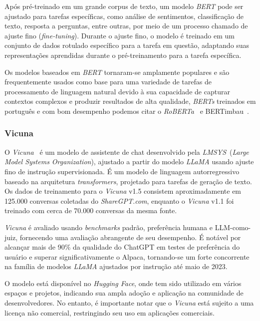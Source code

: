 Após pré-treinado em um grande corpus de texto, um modelo \textit{BERT} pode ser ajustado para tarefas específicas, como análise de sentimentos, classificação de texto, resposta a perguntas, entre outras, por meio de um processo chamado de ajuste fino (\textit{fine-tuning}). Durante o ajuste fino, o modelo é treinado em um conjunto de dados rotulado específico para a tarefa em questão, adaptando suas representações aprendidas durante o pré-treinamento para a tarefa específica.

Os modelos baseados em \textit{BERT} tornaram-se amplamente populares e são frequentemente usados como base para uma variedade de tarefas de processamento de linguagem natural devido à sua capacidade de capturar contextos complexos e produzir resultados de alta qualidade, \textit{BERTs} treinados em português e com bom desempenho podemos citar o \textit{RoBERTa}~\cite{liu2019roberta} e BERTimbau~\cite{souza2020bertimbau}.

\subsubsection{Vicuna}
\label{cap:fund_teorica:sec:modelos:subsec:vicuna}

O \textit{Vicuna}~\cite{vicuna2023} é um modelo de assistente de chat desenvolvido pela \textit{LMSYS}~(\textit{Large Model Systems Organization}), ajustado a partir do modelo \textit{LLaMA} usando ajuste fino de instrução supervisionada. É um modelo de linguagem autorregressivo baseado na arquitetura \textit{transformers}, projetado para tarefas de geração de texto. Os dados de treinamento para o \textit{Vicuna} v1.5 consistem aproximadamente em 125.000 conversas coletadas do \textit{ShareGPT.com}, enquanto o \textit{Vicuna} v1.1 foi treinado com cerca de 70.000 conversas da mesma fonte.

\textit{Vicuna} é avaliado usando \textit{benchmarks} padrão, preferência humana e LLM-como-juiz, fornecendo uma avaliação abrangente de seu desempenho. É notável por alcançar mais de 90\% da qualidade do ChatGPT em testes de preferência do usuário e superar significativamente o Alpaca, tornando-se um forte concorrente na família de modelos \textit{LLaMA} ajustados por instrução até maio de 2023.

O modelo está disponível no \textit{Hugging Face}, onde tem sido utilizado em vários espaços e projetos, indicando sua ampla adoção e aplicação na comunidade de desenvolvedores. No entanto, é importante notar que o \textit{Vicuna} está sujeito a uma licença não comercial, restringindo seu uso em aplicações comerciais.

